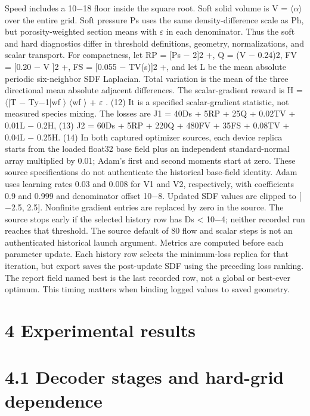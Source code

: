 \documentclass[11pt]{article}
\begin{document}
Speed includes a 10\ensuremath{-}18 floor inside the square root. Soft solid volume is V = \ensuremath{\langle}\ensuremath{\alpha}\ensuremath{\rangle} over the entire
grid. Soft pressure Ps uses the same density-difference scale as Ph, but porosity-weighted section
means with \ensuremath{\varepsilon} in each denominator. Thus the soft and hard diagnostics differ in threshold definitions,
geometry, normalizations, and scalar transport.
For compactness, let RP = [Ps \ensuremath{-} 2]2
+, Q = (V \ensuremath{-} 0.24)2, FV = [0.20 \ensuremath{-} V ]2
+, FS = [0.055 \ensuremath{-} TV(s)]2
+,
and let L be the mean absolute periodic six-neighbor SDF Laplacian. Total variation is the mean
of the three directional mean absolute adjacent differences. The scalar-gradient reward is
H = \ensuremath{\langle}|T \ensuremath{-} Ty\ensuremath{-}1|wf \ensuremath{\rangle}
\ensuremath{\langle}wf \ensuremath{\rangle} + \ensuremath{\varepsilon} . (12)
It is a specified scalar-gradient statistic, not measured species mixing. The losses are
J1 = 40Ds + 5RP + 25Q
+ 0.02TV + 0.01L \ensuremath{-} 0.2H, (13)
J2 = 60Ds + 5RP + 220Q + 480FV + 35FS
+ 0.08TV + 0.04L \ensuremath{-} 0.25H. (14)
In both captured optimizer sources, each device replica starts from the loaded float32 base field plus
an independent standard-normal array multiplied by 0.01; Adam’s first and second moments start
at zero. These source specifications do not authenticate the historical base-field identity. Adam
uses learning rates 0.03 and 0.008 for V1 and V2, respectively, with coefficients 0.9 and 0.999 and
denominator offset 10\ensuremath{-}8. Updated SDF values are clipped to [\ensuremath{-}2.5, 2.5]. Nonfinite gradient entries
are replaced by zero in the source. The source stops early if the selected history row has Ds < 10\ensuremath{-}4;
neither recorded run reaches that threshold. The source default of 80 flow and scalar steps is not
an authenticated historical launch argument.
Metrics are computed before each parameter update. Each history row selects the minimum-loss
replica for that iteration, but export saves the post-update SDF using the preceding loss ranking.
The report field named best is the last recorded row, not a global or best-ever optimum. This
timing matters when binding logged values to saved geometry.

\section*{4 Experimental results}


\section*{4.1 Decoder stages and hard-grid dependence}
\end{document}
